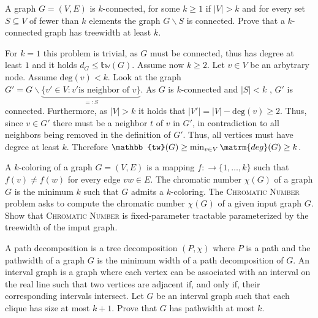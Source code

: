 \documentclass{article}
\begin{document}
\begin{exercise}
    A graph $G = (V,E)$ is $k$-connected, for some $k\geq 1$ if $|V|>k$ and for every set $S\subseteq V$ of fewer than $k$ elements the graph $G\backslash S$ is connected. Prove that a $k$-connected graph has treewidth at least $k$.
\end{exercise}
\begin{solving}
 For $k = 1$ this problem is trivial, as $G$ must be connected, thus has degree at least $1$ and it holds $d_G\leq \mathbb{tw}(G)$. 
 Assume now $k\geq 2$. Let $v\in V$ be an arbytrary node. Assume $\mathrm{deg}(v)<k$. Look at the graph $G'  = G\backslash \underbrace{\{v'\in V: v'\text{is neighbor of }v\}}_{=: S}$. As $G$ is $k$-connected and $|S|<k$ , $G'$ is connected. Furthermore, as $|V|>k$ it holds that $|V'| = |V|-\mathrm{deg}(v) \geq 2$. Thus, since $v\in G'$ there must be a neighbor $t$ of $v$ in $G'$, in contradiction to all neighbors being removed in the definition of $G'$. Thus, all vertices must have degree at least $k$. Therefore $\mathbb{tw}(G)\geq \min_{v\in V}\matrm{deg}(G)\geq k$.
\end{solving}
\newpage

\begin{exercise}
    A $k$-coloring of a graph $G= (V,E)$ is a mapping $f:\to \{1,\dots, k\}$ such that $f(v)\neq f(w)$ for every edge $vw\in E$. The chromatic number $\chi(G)$ of a graph $G$ is the minimum $k$ such that $G$ admits a $k$-coloring. The \textsc{Chromatic Number} problem asks to compute the chromatic number $\chi(G)$ of a given input graph $G$. Show that \textsc{Chromatic Number} is fixed-parameter tractable parameterized by the treewidth of the imput graph.
\end{exercise}
\newpage

\begin{exercise}
    A path decomposition is a tree decomposition $(P,\chi)$ where $P$ is a path and the pathwidth of a graph $G$ is the minimum width of a path decomposition of $G$. An interval graph is a graph where each vertex can be associated with an interval on the real line such that two vertices are adjacent if, and only if, their corresponding intervals intersect. Let $G$ be an interval graph such that each clique has size at most $k+1$. Prove that $G$ has pathwidth at most $k$.
\end{exercise}
\newpage
\end{document}
